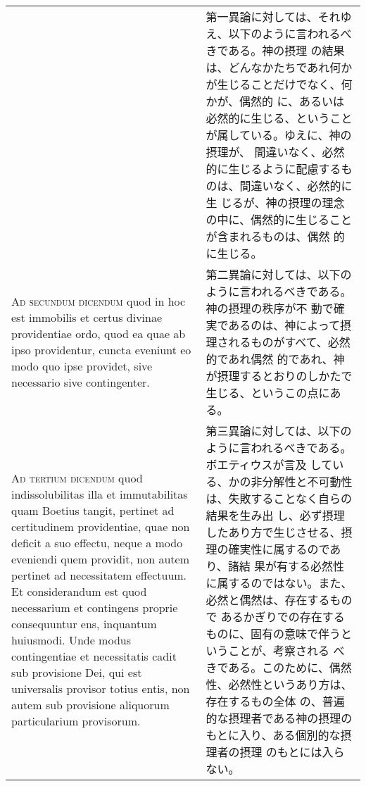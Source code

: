 \documentclass[10pt]{jsarticle} %
\begin{document}
\begin{longtable}{p{21em}p{21em}}
&

第一異論に対しては、それゆえ、以下のように言われるべきである。神の摂理
の結果は、どんなかたちであれ何かが生じることだけでなく、何かが、偶然的
に、あるいは必然的に生じる、ということが属している。ゆえに、神の摂理が、
間違いなく、必然的に生じるように配慮するものは、間違いなく、必然的に生
じるが、神の摂理の理念の中に、偶然的に生じることが含まれるものは、偶然
的に生じる。




\\


{\scshape Ad secundum dicendum} quod in hoc est
immobilis et certus divinae providentiae ordo, quod ea quae ab ipso
providentur, cuncta eveniunt eo modo quo ipse providet, sive necessario
sive contingenter.

&

第二異論に対しては、以下のように言われるべきである。神の摂理の秩序が不
動で確実であるのは、神によって摂理されるものがすべて、必然的であれ偶然
的であれ、神が摂理するとおりのしかたで生じる、というこの点にある。



\\


{\scshape Ad tertium dicendum} quod indissolubilitas
illa et immutabilitas quam Boetius tangit, pertinet ad certitudinem
providentiae, quae non deficit a suo effectu, neque a modo eveniendi
quem providit, non autem pertinet ad necessitatem effectuum. Et
considerandum est quod necessarium et contingens proprie consequuntur
ens, inquantum huiusmodi. Unde modus contingentiae et necessitatis cadit
sub provisione Dei, qui est universalis provisor totius entis, non autem
sub provisione aliquorum particularium provisorum.

&

第三異論に対しては、以下のように言われるべきである。ボエティウスが言及
している、かの非分解性と不可動性は、失敗することなく自らの結果を生み出
し、必ず摂理したあり方で生じさせる、摂理の確実性に属するのであり、諸結
果が有する必然性に属するのではない。また、必然と偶然は、存在するもので
あるかぎりでの存在するものに、固有の意味で伴うということが、考察される
べきである。このために、偶然性、必然性というあり方は、存在するもの全体
の、普遍的な摂理者である神の摂理のもとに入り、ある個別的な摂理者の摂理
のもとには入らない。

\end{longtable}
\newpage
\end{document}
